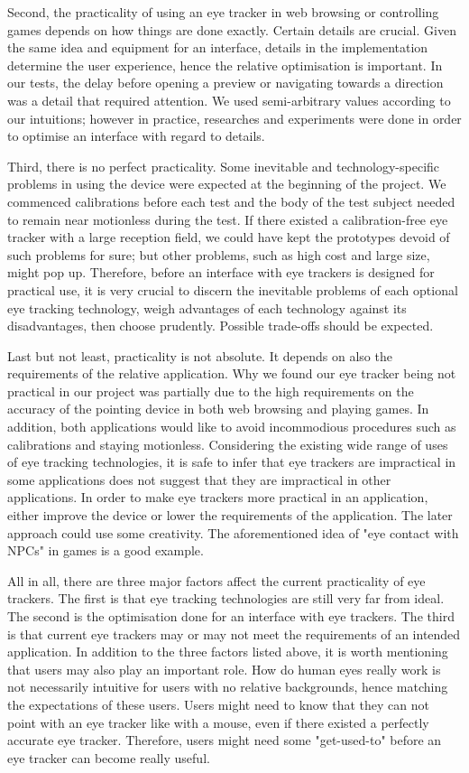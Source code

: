 \documentclass[english]{tktltiki}
\begin{document}
Second, the practicality of using an eye tracker in web browsing or controlling games depends on how things are done exactly. Certain details are crucial. Given the same idea and equipment for an interface, details in the implementation determine the user experience, hence the relative optimisation is important. In our tests, the delay before opening a preview or navigating towards a direction was a detail that required attention. We used semi-arbitrary values according to our intuitions; however in practice, researches and experiments were done in order to optimise an interface with regard to details.

Third, there is no perfect practicality. Some inevitable and technology-specific problems in using the device were expected at the beginning of the project. We commenced calibrations before each test and the body of the test subject needed to remain near motionless during the test. If there existed a calibration-free eye tracker with a large reception field, we could have kept the prototypes devoid of such problems for sure; but other problems, such as high cost and large size, might pop up. Therefore, before an interface with eye trackers is designed for practical use, it is very crucial to discern the inevitable problems of each optional eye tracking technology, weigh advantages of each technology against its disadvantages, then choose prudently. Possible trade-offs should be expected.

Last but not least, practicality is not absolute. It depends on also the requirements of the relative application. Why we found our eye tracker being not practical in our project was partially due to the high requirements on the accuracy of the pointing device in both web browsing and playing games. In addition, both applications would like to avoid incommodious procedures such as calibrations and staying motionless. Considering the existing wide range of uses of eye tracking technologies, it is safe to infer that eye trackers are impractical in some applications does not suggest that they are impractical in other applications. In order to make eye trackers more practical in an application, either improve the device or lower the requirements of the application. The later approach could use some creativity. The aforementioned idea of "eye contact with NPCs" in games is a good example. 

All in all, there are three major factors affect the current practicality of eye trackers. The first is that eye tracking technologies are still very far from ideal. The second is the optimisation done for an interface with eye trackers. The third is that current eye trackers may or may not meet the requirements of an intended application. In addition to the three factors listed above, it is worth mentioning that users may also play an important role. How do human eyes really work is not necessarily intuitive for users with no relative backgrounds, hence matching the expectations of these users. Users might need to know that they can not point with an eye tracker like with a mouse, even if there existed a perfectly accurate eye tracker. Therefore, users might need some "get-used-to" before an eye tracker can become really useful. 
\end{document}
